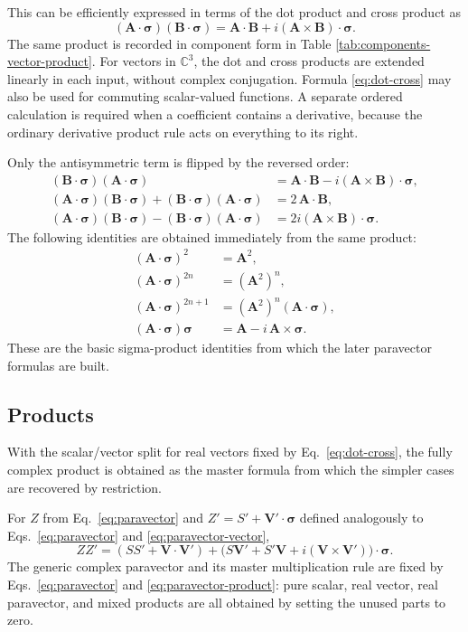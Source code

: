 \documentclass[10pt,letterpaper]{article}
\newcommand{\C}{\mathbb{C}}
\newcommand{\pv}[1]{#1}
\newcommand{\vct}[1]{\mathbf{#1}}
\newcommand{\sigv}{\vct{\pv{\bm{\sigma}}}}
\begin{document}
This can be efficiently expressed in terms of the dot product and cross product as
\begin{equation}
(\vct{A}\cdot\sigv)(\vct{B}\cdot\sigv)=\vct{A}\cdot\vct{B}+i(\vct{A}\times\vct{B})\cdot\sigv.
\label{eq:dot-cross}
\end{equation}
The same product is recorded in component form in Table
\ref{tab:components-vector-product}. For vectors in \(\C^3\), the dot and
cross products are extended linearly in each input, without complex
conjugation. Formula \eqref{eq:dot-cross} may also be used for commuting
scalar-valued functions. A separate ordered calculation is required when a
coefficient contains a derivative, because the ordinary derivative product
rule acts on everything to its right.

Only the antisymmetric term is flipped by the reversed order:
\begin{align*}
(\vct{B}\cdot\sigv)(\vct{A}\cdot\sigv)
&= \vct{A}\cdot\vct{B}-i(\vct{A}\times\vct{B})\cdot\sigv,\\
(\vct{A}\cdot\sigv)(\vct{B}\cdot\sigv)+(\vct{B}\cdot\sigv)(\vct{A}\cdot\sigv)
&= 2\,\vct{A}\cdot\vct{B},\\
(\vct{A}\cdot\sigv)(\vct{B}\cdot\sigv)-(\vct{B}\cdot\sigv)(\vct{A}\cdot\sigv)
&= 2i(\vct{A}\times\vct{B})\cdot\sigv.
\end{align*}
The following identities are obtained immediately from the same product:
\begin{align*}
(\vct{A}\cdot\sigv)^2 &= \vct{A}^2,\\
(\vct{A}\cdot\sigv)^{2n} &= (\vct{A}^2)^n,\\
(\vct{A}\cdot\sigv)^{2n+1} &= (\vct{A}^2)^n(\vct{A}\cdot\sigv),\\
(\vct{A}\cdot\sigv)\sigv &= \vct{A}-i\,\vct{A}\times\sigv.
\end{align*}
These are the basic sigma-product identities from which the later paravector formulas are built.

\subsection{Products}
With the scalar/vector split for real vectors fixed by Eq.\ \eqref{eq:dot-cross}, the fully complex product is obtained as the master formula from which the simpler cases are recovered by restriction.

For \(\pv{Z}\) from Eq.\ \eqref{eq:paravector} and \(\pv{Z}'=S'+\vct{V}'\cdot\sigv\) defined analogously to Eqs.\ \eqref{eq:paravector} and \eqref{eq:paravector-vector},
\begin{equation}
\pv{Z}\pv{Z}'=(SS'+\vct{V}\cdot\vct{V}')+\big(S\vct{V}'+S'\vct{V}+i(\vct{V}\times\vct{V}')\big)\cdot\sigv.
\label{eq:paravector-product}
\end{equation}
The generic complex paravector and its master multiplication rule are fixed by Eqs.\ \eqref{eq:paravector} and \eqref{eq:paravector-product}: pure scalar, real vector, real paravector, and mixed products are all obtained by setting the unused parts to zero.
\end{document}
